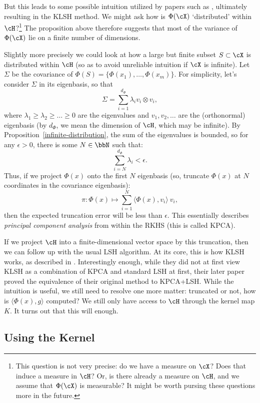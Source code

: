 \documentclass[twoside,11pt]{homework}
\begin{document}
But this leads to some possible intuition utilized by papers such as \cite{K2012,J2015}, ultimately resulting in the KLSH method. We might ask how is $\Phi(\cX)$ `distributed' within $\cH$?\footnote{This question is not very precise: do we have a measure on $\cX$? Does that induce a measure in $\cH$? Or, is there already a measure on $\cH$, and we assume that $\Phi(\cX)$ is measurable? It might be worth pursing these questions more in the future.} The proposition above therefore suggests that most of the variance of $\Phi(\cX)$ lie on a finite number of dimensions.

Slightly more precisely we could look at how a large but finite subset $S \subset \cX$ is distributed within $\cH$ (so as to avoid unreliable intuition if $\cX$ is infinite). Let $\Sigma$ be the covariance of $\Phi(S) = \{\Phi(x_1),\dotsc, \Phi(x_m)\}$. For simplicity, let's consider $\Sigma$ in its eigenbasis, so that
\[\Sigma = \sum_{i=1}^{d_\Phi} \lambda_i v_i \otimes v_i,\]
where $\lambda_1 \geq \lambda_2 \geq \dotsc \geq 0$ are the eigenvalues and $v_1,v_2,\dotsc$ are the (orthonormal) eigenbasis (by $d_\Phi$, we mean the dimension of $\cH$, which may be infinite). By Proposition~\ref{infinite-distribution}, the sum of the eigenvalues is bounded, so for any $\epsilon > 0$, there is some $N \in \bbN$ such that:
\[\sum_{i = N}^{d_{\Phi}} \lambda_i < \epsilon.\]
Thus, if we project $\Phi(x)$ onto the first $N$ eigenbasis (so, truncate $\Phi(x)$ at $N$ coordinates in the covariance eigenbasis):
\[\pi: \Phi(x) \mapsto \sum_{i=1}^N \langle \Phi(x), v_i\rangle \ v_i, \]
then the expected truncation error will be less than $\epsilon$. This essentially describes \emph{principal component analysis} from within the RKHS (this is called KPCA).

If we project $\cH$ into a finite-dimensional vector space by this truncation, then we can follow up with the usual LSH algorithm. At its core, this is how KLSH works, as described in \cite{K2012}. Interestingly enough, while they did not at first view KLSH as a combination of KPCA and standard LSH at first, their later paper \cite{J2015} proved the equivalence of their original method to KPCA+LSH. While the intuition is useful, we still need to resolve one more matter: truncated or not, how is $\langle \Phi(x), g\rangle$ computed? We still only have access to $\cH$ through the kernel map $K$. It turns out that this will enough.

\subsection{Using the Kernel}
\end{document}
